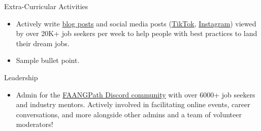 \documentclass{faang} %
\begin{document}
\begin{rSection}{Extra-Curricular Activities} 
\begin{itemize}
    \item 	Actively write \href{https://www.faangpath.com/blog/}{blog posts} and social media posts (\href{https://www.tiktok.com/@faangpath}{TikTok}, \href{https://www.instagram.com/faangpath/?hl=en}{Instagram}) viewed by over 20K+ job seekers per week to help people with best practices to land their dream jobs. 
    \item	Sample bullet point.
\end{itemize}
\end{rSection}

\begin{rSection}{Leadership} 
\begin{itemize}
    \item Admin for the \href{https://discord.com/invite/WWbjEaZ}{FAANGPath Discord community} with over 6000+ job seekers and industry mentors. Actively involved in facilitating online events, career conversations, and more alongside other admins and a team of volunteer moderators! 
\end{itemize}
\end{rSection}
\end{document}
